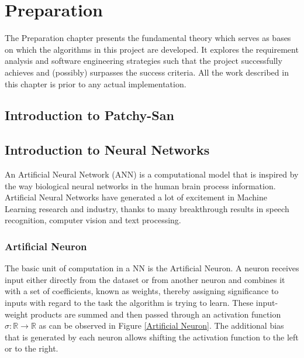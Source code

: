 

\chapter{Preparation}

The Preparation chapter presents the fundamental theory which serves as bases on which the algorithms in this project are developed. It explores the requirement analysis and software engineering strategies such that the project successfully achieves and (possibly) surpasses the success criteria. All the work described in this chapter is prior to any actual implementation.

\section{Introduction to Patchy-San}

\section{Introduction to Neural Networks}

An Artificial Neural Network (ANN) is a computational model that is inspired by the way biological neural networks in the human brain process information. Artificial Neural Networks have generated a lot of excitement in Machine Learning research and industry, thanks to many breakthrough results in speech recognition, computer vision and text processing.

\subsection{Artificial Neuron}

The basic unit of computation in a NN is the Artificial Neuron. A neuron receives input either directly from the dataset or from another neuron and combines it with a set of coefficients, known as weights, thereby assigning significance to inputs with regard to the task the algorithm is trying to learn. These input-weight products are summed and then passed through an activation function $\sigma : \mathbb{R} \rightarrow \mathbb{R}$ as can be observed in Figure \ref{Artificial Neuron}. The additional bias that is generated by each neuron allows shifting the activation function to the left or to the right. \\

